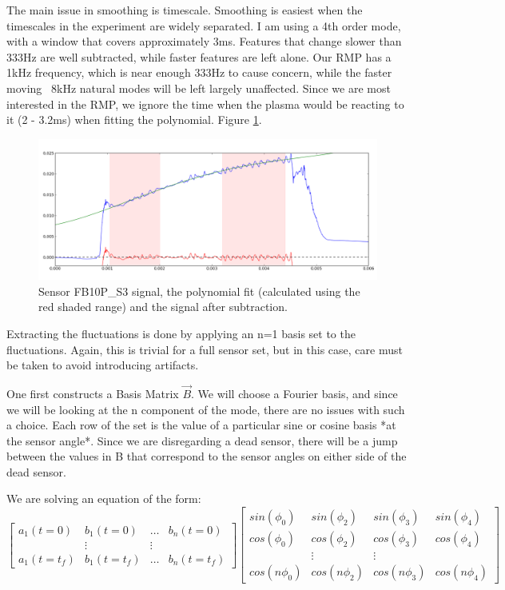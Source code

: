 \documentclass{article}
\begin{document}
\par
The main issue in smoothing is timescale.  Smoothing is easiest when the timescales in the experiment are widely separated.  I am using a 4th order mode, with a window that covers approximately 3ms.  Features that change slower than 333Hz are well subtracted, while faster features are left alone.  Our RMP has a 1kHz frequency, which is near enough 333Hz to cause concern, while the faster moving ~8kHz natural modes will be left largely unaffected.  Since we are most interested in the RMP, we ignore the time when the plasma would be reacting to it (2 - 3.2ms) when fitting the polynomial.  Figure \ref{poly_subtraction}. 
\begin{figure}[htb]
\includegraphics[width = \textwidth]{./Report_pic_minus_poly_sig.png}\caption{Sensor FB10P\_S3 signal, the polynomial fit (calculated using the red shaded range) and the signal after subtraction.}
\label{poly_subtraction}
\end{figure}
\par 
Extracting the fluctuations is done by applying an n=1 basis set to the fluctuations.  Again, this is trivial for a full sensor set, but in this case, care must be taken to avoid introducing artifacts.\par
One first constructs a Basis Matrix $\overrightarrow{B}$.  We will choose a Fourier basis, and since we will be looking at the n component of the mode, there are no issues with such a choice.  Each row of the set is the value of a particular sine or cosine basis *at the sensor angle*.  Since we are disregarding a dead sensor, there will be a jump between the values in B that correspond to the sensor angles on either side of the dead sensor.\par
We are solving an equation of the form:$$\begin{bmatrix}
a_1(t=0) & b_1(t=0) & \dots & b_n(t=0)\\
 & \vdots & \vdots & \\
a_1(t=t_f) & b_1(t=t_f) & \dots & b_n(t=t_f)
\end{bmatrix} \begin{bmatrix}
sin(\phi_0) & sin(\phi_2) &sin(\phi_3) & sin(\phi_4)\\
cos(\phi_0) & cos(\phi_2) &cos(\phi_3) & cos(\phi_4)\\
& \vdots & \vdots & \\
cos(n\phi_0) & cos(n\phi_2) &cos(n\phi_3) & cos(n\phi_4)
\end{bmatrix}$$
\end{document}
